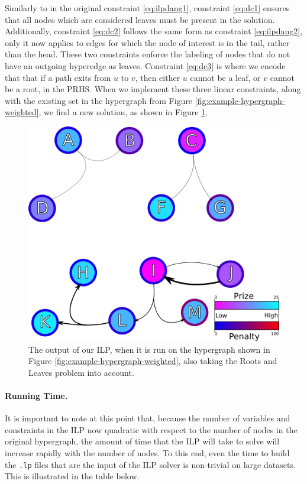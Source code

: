 \documentclass[12pt,twoside]{reedthesis}
\theoremstyle{definition}
\begin{document}
Similarly to in the original constraint \eqref{eq:ilpdang1}, constraint \eqref{eq:dc1} ensures that all nodes which are considered leaves must be present in the solution. Additionally, constraint \eqref{eq:dc2} follows the same form as constraint \eqref{eq:ilpdang2}, only it now applies to edges for which the node of interest is in the tail, rather than the head. These two constraints enforce the labeling of nodes that do not have an outgoing hyperedge as leaves. Constraint \eqref{eq:dc3} is where we encode that that if a path exits from $u$ to $v$, then either $u$ cannot be a leaf, or $v$ cannot be a root, in the PRHS. When we implement these three linear constraints, along with the existing set in the hypergraph from Figure \ref{fig:example-hypergraph-weighted}, we find a new solution, as shown in Figure \ref{fig:example-hypergraph-weighted_DC}.

\begin{figure}[hp]
  \begin{center}
    \includegraphics[width=\textwidth/2]{example-hypergraph-weighted_DC}
  \caption[Output from ILP after Roots and Leaves.]{The output of our ILP, when it is run on the hypergraph shown in Figure \ref{fig:example-hypergraph-weighted}, also taking the Roots and Leaves problem into account.}
  \label{fig:example-hypergraph-weighted_DC}
  \end{center}
\end{figure}

\paragraph{Running Time.}It is important to note at this point that, because the number of variables and constraints in the ILP now quadratic with respect to the number of nodes in the original hypergraph, the amount of time that the ILP will take to solve will increase rapidly with the number of nodes. To this end, even the time to build the \texttt{.lp} files that are the input of the ILP solver is non-trivial on large datasets. This is illustrated in the table below.
\end{document}
